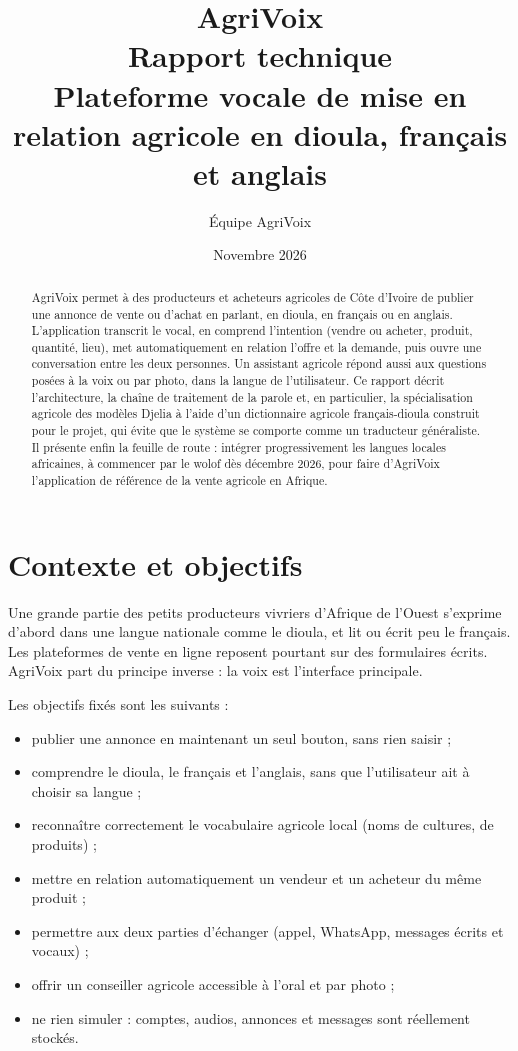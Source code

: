 \documentclass[12pt,a4paper]{article}
\title{\textbf{AgriVoix}\\[4pt]\large Rapport technique\\[2pt]
\normalsize Plateforme vocale de mise en relation agricole en dioula, français et anglais}
\author{Équipe AgriVoix}
\date{Novembre 2026}
\begin{document}
\maketitle
\thispagestyle{empty}

\begin{abstract}
AgriVoix permet à des producteurs et acheteurs agricoles de Côte d'Ivoire de publier une annonce
de vente ou d'achat en parlant, en dioula, en français ou en anglais. L'application transcrit le
vocal, en comprend l'intention (vendre ou acheter, produit, quantité, lieu), met automatiquement en
relation l'offre et la demande, puis ouvre une conversation entre les deux personnes. Un assistant
agricole répond aussi aux questions posées à la voix ou par photo, dans la langue de l'utilisateur.
Ce rapport décrit l'architecture, la chaîne de traitement de la parole et, en particulier, la
spécialisation agricole des modèles Djelia à l'aide d'un dictionnaire agricole français-dioula
construit pour le projet, qui évite que le système se comporte comme un traducteur généraliste.
Il présente enfin la feuille de route : intégrer progressivement les langues locales africaines,
à commencer par le wolof dès décembre 2026, pour faire d'AgriVoix l'application de référence de la
vente agricole en Afrique.
\end{abstract}

\tableofcontents
\newpage

\section{Contexte et objectifs}

Une grande partie des petits producteurs vivriers d'Afrique de l'Ouest s'exprime d'abord dans une
langue nationale comme le dioula, et lit ou écrit peu le français. Les plateformes de vente en ligne
reposent pourtant sur des formulaires écrits. AgriVoix part du principe inverse : la voix est
l'interface principale.

Les objectifs fixés sont les suivants :
\begin{itemize}
  \item publier une annonce en maintenant un seul bouton, sans rien saisir ;
  \item comprendre le dioula, le français et l'anglais, sans que l'utilisateur ait à choisir sa langue ;
  \item reconnaître correctement le vocabulaire agricole local (noms de cultures, de produits) ;
  \item mettre en relation automatiquement un vendeur et un acheteur du même produit ;
  \item permettre aux deux parties d'échanger (appel, WhatsApp, messages écrits et vocaux) ;
  \item offrir un conseiller agricole accessible à l'oral et par photo ;
  \item ne rien simuler : comptes, audios, annonces et messages sont réellement stockés.
\end{itemize}
\end{document}
